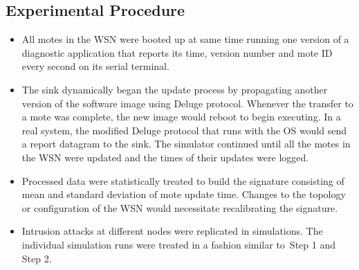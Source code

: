 \documentclass{CRPITStyle}
\begin{document}
\subsection*{Experimental Procedure}
\label{subsec:proc}

\begin{itemize}
\item All motes in the WSN were booted up at same time running one version of a diagnostic application that reports its time, version number and mote ID every second on its serial terminal. 
\item The sink dynamically began the update process by propagating another version of the software image using Deluge protocol. %
Whenever the transfer to a mote was complete, the new image would  reboot to begin executing.
In a real system, the modified Deluge protocol that runs with the OS would send a report datagram to the sink.
The simulator continued until all the motes in the WSN were updated and the times of their updates were logged. 
\item Processed data  were statistically treated to build the signature consisting of mean and standard deviation of  mote update time.
Changes to the topology or configuration of the WSN would necessitate recalibrating the signature.
\item Intrusion attacks at different nodes were replicated in simulations.
The individual simulation runs were treated in a fashion  similar to~Step 1 and Step 2.

\end{itemize}
\end{document}
